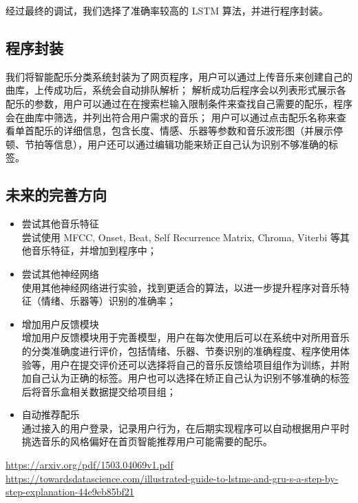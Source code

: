 \documentclass[a4paper,utf8,10pt]{article}
\newcommand{\sept}{\setlength\itemsep{-4pt}}
\begin{document}
经过最终的调试，我们选择了准确率较高的 LSTM 算法，并进行程序封装。

\subsection{程序封装}
我们将智能配乐分类系统封装为了网页程序，用户可以通过上传音乐来创建自己的曲库，上传成功后，系统会自动排队解析；
解析成功后程序会以列表形式展示各配乐的参数，用户可以通过在在搜索栏输入限制条件来查找自己需要的配乐，程序会在曲库中筛选，并列出符合用户需求的音乐；
用户可以通过点击配乐名称来查看单首配乐的详细信息，包含长度、情感、乐器等参数和音乐波形图（并展示停顿、节拍等信息），用户还可以通过编辑功能来矫正自己认为识别不够准确的标签。

\subsection{未来的完善方向}
\noindent\begin{itemize}
  \sept
  \item 尝试其他音乐特征\\
  尝试使用 MFCC, Onset, Beat, Self Recurrence Matrix, Chroma, Viterbi 等其他音乐特征，并增加到程序中；
  \item 尝试其他神经网络\\
  使用其他神经网络进行实验，找到更适合的算法，以进一步提升程序对音乐特征（情绪、乐器等）识别的准确率；
  \item 增加用户反馈模块\\
  增加用户反馈模块用于完善模型，用户在每次使用后可以在系统中对所用音乐的分类准确度进行评价，包括情绪、乐器、节奏识别的准确程度、程序使用体验等，用户在提交评价还可以选择将自己的音乐反馈给项目组作为训练，并附加自己认为正确的标签。用户也可以选择在矫正自己认为识别不够准确的标签后将音乐盒相关数据提交给项目组；
  \item 自动推荐配乐\\
  通过接入的用户登录，记录用户行为，在后期实现程序可以自动根据用户平时挑选音乐的风格偏好在首页智能推荐用户可能需要的配乐。
\end{itemize}

{}


\url{https://arxiv.org/pdf/1503.04069v1.pdf}
\url{https://towardsdatascience.com/illustrated-guide-to-lstms-and-gru-s-a-step-by-step-explanation-44e9eb85bf21}
\end{document}
